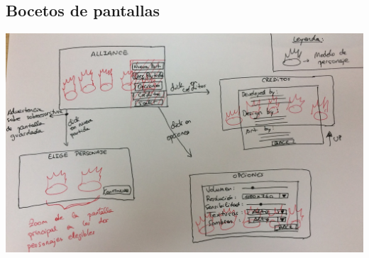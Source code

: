 \documentclass[11pt, twoside]{article}
\begin{document}
\subsection{Bocetos de pantallas}
\includegraphics[width=16cm]{./images/pantallas.png}
\end{document}
